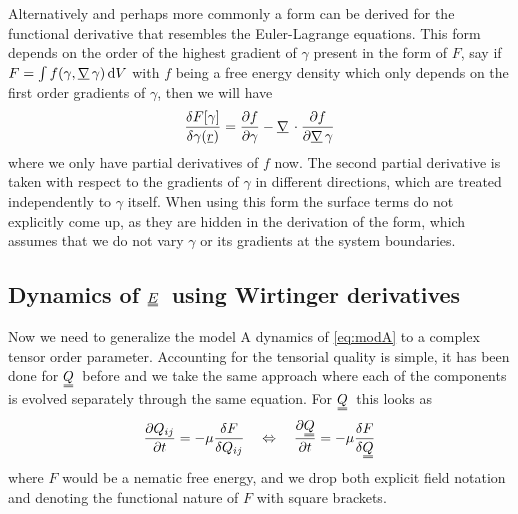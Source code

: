 \documentclass[12pt]{article}
\newcommand{\suf}[2]{\stackunder[0.5pt]{\stackunder[1pt]{\ensuremath{#1}}{\rule{\widthof{\ensuremath{#2}}*\real{0.9}}{.1ex}}}{}}
\newcommand{\duf}[2]{\stackunder[0.5pt]{\stackunder[0.8pt]{\stackunder[1pt]{\ensuremath{#1}}{\rule{\widthof{\ensuremath{#2}}*\real{0.9}}{.1ex}}}{\rule{\widthof{\ensuremath{#2}}*\real{0.9}}{.1ex}}}{}}
\newcommand{\su}[1]{\suf{#1}{#1}}
\newcommand{\du}[1]{\duf{#1}{#1}}
\newcommand{\mgrad}{\ensuremath{\suf{\nabla}{K}\,}}
\newcommand{\QQ}{\ensuremath{\du{Q}}}
\newcommand{\EE}{\ensuremath{\du{E}}}
\begin{document}
        Alternatively and perhaps more commonly a form can be derived for the functional derivative that resembles the Euler-Lagrange equations.
        This form depends on the order of the highest gradient of $\gamma$ present in the form of $F$, say if $F = \int f(\gamma, \mgrad \gamma) \dd{V}$ with $f$ being a free energy density which only depends on the first order gradients of $\gamma$, then we will have
        \begin{equation}
            \fdv{F[\gamma]}{\gamma(\su{r})} = \pdv{f}{\gamma} - \mgrad \cdot \pdv{f}{\mgrad \gamma}
        \end{equation}
        where we only have partial derivatives of $f$ now.
        The second partial derivative is taken with respect to the gradients of $\gamma$ in different directions, which are treated independently to $\gamma$ itself.
        When using this form the surface terms do not explicitly come up, as they are hidden in the derivation of the form, which assumes that we do not vary $\gamma$ or its gradients at the system boundaries.

    \subsection{Dynamics of \EE\ using Wirtinger derivatives}\label{sec:Ei_dyn}
        Now we need to generalize the model A dynamics of \cref{eq:modA} to a complex tensor order parameter.
        Accounting for the tensorial quality is simple, it has been done for \QQ\ before and we take the same approach where each of the components is evolved separately through the same equation.
        For \QQ\ this looks as
        \begin{equation}
            \pdv{Q_{ij}}{t} = -\mu \fdv{F}{Q_{ij}} \quad\Leftrightarrow\quad \pdv{\du{Q}}{t} = -\mu\fdv{F}{\du{Q}}
        \end{equation}
        where $F$ would be a nematic free energy, and we drop both explicit field notation and denoting the functional nature of $F$ with square brackets.
\end{document}
